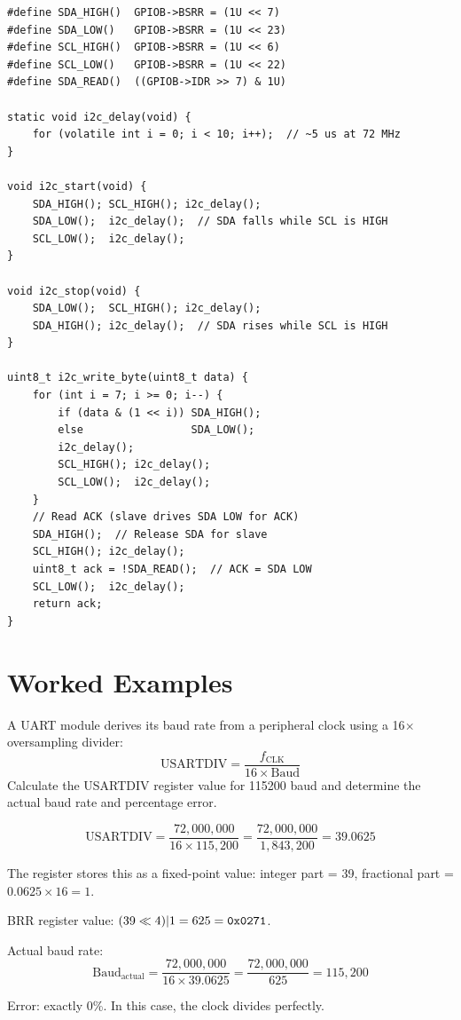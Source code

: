 \begin{lstlisting}[style=C, caption={Bit-bang I\textsuperscript{2}C master in C (simplified).}]
#define SDA_HIGH()  GPIOB->BSRR = (1U << 7)
#define SDA_LOW()   GPIOB->BSRR = (1U << 23)
#define SCL_HIGH()  GPIOB->BSRR = (1U << 6)
#define SCL_LOW()   GPIOB->BSRR = (1U << 22)
#define SDA_READ()  ((GPIOB->IDR >> 7) & 1U)

static void i2c_delay(void) {
    for (volatile int i = 0; i < 10; i++);  // ~5 us at 72 MHz
}

void i2c_start(void) {
    SDA_HIGH(); SCL_HIGH(); i2c_delay();
    SDA_LOW();  i2c_delay();  // SDA falls while SCL is HIGH
    SCL_LOW();  i2c_delay();
}

void i2c_stop(void) {
    SDA_LOW();  SCL_HIGH(); i2c_delay();
    SDA_HIGH(); i2c_delay();  // SDA rises while SCL is HIGH
}

uint8_t i2c_write_byte(uint8_t data) {
    for (int i = 7; i >= 0; i--) {
        if (data & (1 << i)) SDA_HIGH();
        else                 SDA_LOW();
        i2c_delay();
        SCL_HIGH(); i2c_delay();
        SCL_LOW();  i2c_delay();
    }
    // Read ACK (slave drives SDA LOW for ACK)
    SDA_HIGH();  // Release SDA for slave
    SCL_HIGH(); i2c_delay();
    uint8_t ack = !SDA_READ();  // ACK = SDA LOW
    SCL_LOW();  i2c_delay();
    return ack;
}
\end{lstlisting}

\section{Worked Examples}
\label{sec:io:examples}

\begin{example}
A UART module derives its baud rate from a  peripheral clock using a 16$\times$ oversampling divider:
\[
  \text{USARTDIV} = \frac{f_{\text{CLK}}}{16 \times \text{Baud}}
\]
Calculate the USARTDIV register value for 115200 baud and determine the actual baud rate and percentage error.

\begin{solution}
\[
  \text{USARTDIV} = \frac{72{,}000{,}000}{16 \times 115{,}200} = \frac{72{,}000{,}000}{1{,}843{,}200} = 39.0625
\]

The register stores this as a fixed-point value: integer part = 39, fractional part = $0.0625 \times 16 = 1$.

BRR register value: $(39 \ll 4) | 1 = 625 = \texttt{0x0271}$.

Actual baud rate:
\[
  \text{Baud}_{\text{actual}} = \frac{72{,}000{,}000}{16 \times 39.0625} = \frac{72{,}000{,}000}{625} = 115{,}200
\]

Error: exactly 0\%. In this case, the clock divides perfectly.
\end{solution}
\end{example}

